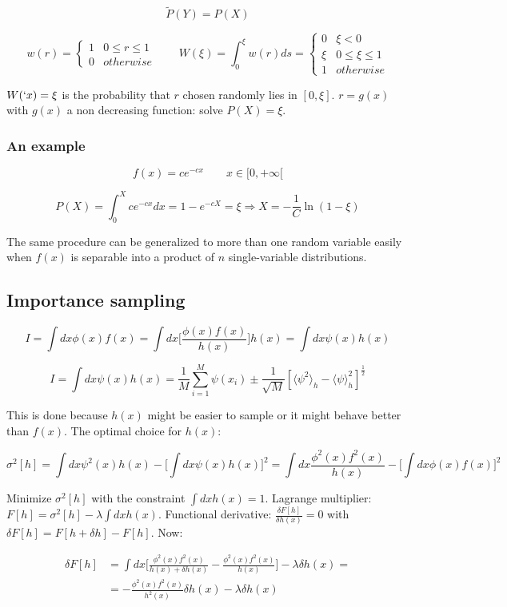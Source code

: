 	$$\tilde{P}(Y) = P(X)$$

	$$w(r) = \begin{cases}1 &0\le r\le 1\\0 &otherwise\end{cases}\qquad W(\xi) = \int_0^\xi w(r)ds = \begin{cases}0 & \xi<0\\\xi & 0\le\xi\le1\\1 &otherwise\end{cases}$$

	$W(`x) = \xi$ is the probability that $r$ chosen randomly lies in $[0, \xi]$.
	$r = g(x)$ with $g(x)$ a non decreasing function: solve $P(X) = \xi$.

		\subsubsection{An example}

		$$f(x) = ce^{-cx}\qquad x\in[0, +\infty[$$

		$$P(X) = \int_0^Xce^{-cx}dx = 1- e^{-cX} = \xi\Rightarrow X = -\frac{1}{C}\ln(1-\xi)$$

		The same procedure can be generalized to more than one random variable easily when $f(x)$ is separable into a product of $n$ single-variable distributions.

	\subsection{Importance sampling}

	$$I = \int dx\phi(x)f(x) = \int dx\biggl[\frac{\phi(x)f(x)}{h(x)}\biggr]h(x) = \int dx\psi(x)h(x)$$

	$$I = \int dx\psi(x)h(x) = \frac{1}{M}\sum\limits_{i=1}^M\psi(x_i)\pm\frac{1}{\sqrt{M}}[\langle\psi^2\rangle_h-\langle\psi\rangle_h^2]^{\frac{1}{2}}$$

	This is done because $h(x)$ might be easier to sample or it might behave better than $f(x)$.
	The optimal choice for $h(x)$:

	$$\sigma^2[h] = \int dx\psi^2(x)h(x) - \biggl[\int dx\psi(x)h(x)\biggr]^2 = \int dx\frac{\phi^2(x)f^2(x)}{h(x)}-\biggl[\int dx\phi(x)f(x)\biggr]^2$$

	Minimize $\sigma^2[h]$ with the constraint $\int dx h(x) = 1$.
	Lagrange multiplier: $F[h] = \sigma^2[h]-\lambda\int dxh(x)$.
	Functional derivative: $\frac{\delta F[h]}{\delta h(x)} = 0$ with $\delta F[h] = F[h+\delta h]-F[h]$.
	Now:

	\begin{align*}
		\delta F[h] &= \int dx\biggl[\frac{\phi^2(x)f^2(x)}{h(x) + \delta h(x)} - \frac{\phi^2(x)f^2(x)}{h(x)}\biggr]-\lambda\delta h(x)=\\
								&=-\frac{\phi^2(x)f^2(x)}{h^2(x)}\delta h(x)-\lambda\delta h(x)
	\end{align*}

